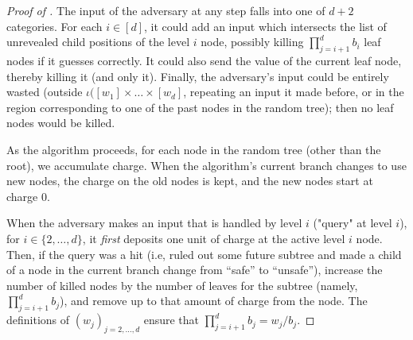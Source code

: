 \begin{itemize}
\begin{itemize}
\begin{proof}[Proof of ]
  The input of the adversary at any step falls into one of $d + 2$ categories.
  For each $i \in [d]$, it could add an input which intersects the list
  of unrevealed child positions of the level $i$ node, possibly killing
  $\prod_{j=i + 1}^{d} b_i$ leaf nodes if it guesses correctly. It could
  also send the value of the current leaf 
  node, thereby killing it (and only it).
  Finally, the adversary's input could be entirely wasted (outside $\iota([w_1]\times\ldots\times[w_d]$, repeating an input it made before, or in
  the region corresponding to one of the past nodes in the random tree); then
  no leaf nodes would be killed.

  As the algorithm proceeds, for each node in the random tree (other than
  the root), we accumulate charge. When the algorithm's current branch changes
  to use new nodes, the charge on the old nodes is kept, and the new nodes
  start at charge $0$.
  
  When the adversary makes an input that is handled by level $i$ ("query" at level $i$),
  for $i \in \{2,\ldots,d\}$, it
  \emph{first} deposits one unit of charge at the active level $i$ node.
  Then, if the query was a hit (i.e, ruled out some future subtree and made
  a child of a node in the current branch change from ``safe'' to ``unsafe''), increase
  the number of killed nodes by the number of leaves for the subtree
  (namely, $\prod_{j={i+1}}^{d} b_j$), and remove up to that amount 
  of charge from the node. The definitions of $(w_j)_{j=2,\ldots,d}$ ensure
  that $\prod_{j={i+1}}^{d} b_j = w_j / b_j$.
  

\end{proof}
\end{itemize}
\end{itemize}
